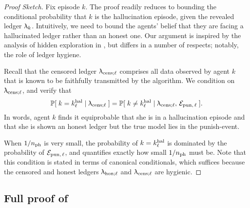 \begin{proof}[Proof Sketch]
Fix episode $k$. The proof readily reduces to bounding the conditional probability that $k$ is the hallucination episode, given the revealed ledger $\uplambda_k$. Intuitively, we need to bound the agents' belief that they are facing a hallucinated ledger rather than an honest one. Our argument is inspired by the analysis of hidden exploration in \cite{ICexploration-ec15}, but differs in a number of respects; notably, the role of ledger hygiene.

Recall that the censored ledger $\uplambda_{\mathrm{cens};\ell}$ comprises all data observed by agent $k$ that is known to be faithfully transmitted by the algorithm. We condition on $\uplambda_{\mathrm{cens};\ell}$, and verify that
\begin{align}\label{eq:Prhall_ledhall}
\operatorname{\mathbb{P}}[\; k=k^{\mathrm{hal}}_{\ell} \mid \uplambda_{\mathrm{cens};\ell} \;] = \operatorname{\mathbb{P}}[\; k\neq k^{\mathrm{hal}}_{\ell} \mid \uplambda_{\mathrm{cens};\ell},\, \mathcal{E}_{\mathrm{pun},\,\ell}\;].
\end{align}
In words, agent $k$ finds it equiprobable that she is in a hallucination episode and that she is shown an honest ledger but the true model lies in the punish-event.

When $1/n_{\mathrm{ph}}$ is very small, the probability of $k = k^{\mathrm{hal}}_{\ell}$ is dominated by the probability of $\mathcal{E}_{\mathrm{pun},\,\ell}$, and  quantifies exactly how small $1/n_{\mathrm{ph}}$ must be. Note that this condition is stated in terms of canonical conditionals, which suffices because the censored and honest ledgers $\uplambda_{\mathrm{hon};\ell}$ and $\uplambda_{\mathrm{cens};\ell}$ are hygienic.
\end{proof}

\subsection{Full proof of }
\label{sec:det_transitions}


